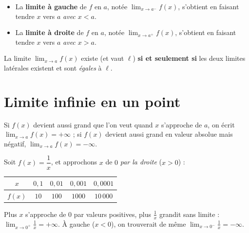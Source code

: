 \begin{definition}
\begin{itemize}
  \item La \textbf{limite à gauche} de $f$ en $a$, notée $\displaystyle\lim_{x\to a^-}f(x)$,
        s'obtient en faisant tendre $x$ vers $a$ \emph{avec $x<a$}.
  \item La \textbf{limite à droite} de $f$ en $a$, notée $\displaystyle\lim_{x\to a^+}f(x)$,
        s'obtient en faisant tendre $x$ vers $a$ \emph{avec $x>a$}.
\end{itemize}
La limite $\displaystyle\lim_{x\to a}f(x)$ existe (et vaut $\ell$) \textbf{si et seulement si}
les deux limites latérales existent et sont \emph{égales} à $\ell$.
\end{definition}

\section{Limite infinie en un point}

\begin{aretenir}
Si $f(x)$ devient aussi grand que l'on veut quand $x$ s'approche de $a$, on écrit
$\displaystyle\lim_{x\to a}f(x)=+\infty$ ; si $f(x)$ devient aussi grand en valeur
absolue mais négatif, $\displaystyle\lim_{x\to a}f(x)=-\infty$.
\end{aretenir}

\begin{exemple}
Soit $f(x)=\dfrac{1}{x}$, et approchons $x$ de $0$ \emph{par la droite} ($x>0$) :
\begin{center}\renewcommand{\arraystretch}{1.25}
\begin{tabular}{@{}c|cccc@{}}
\toprule
$x$    & $0{,}1$ & $0{,}01$ & $0{,}001$ & $0{,}0001$ \\
\midrule
$f(x)$ & $10$    & $100$    & $1000$    & $10\,000$ \\
\bottomrule
\end{tabular}
\end{center}
Plus $x$ s'approche de $0$ par valeurs positives, plus $\frac1x$ grandit sans limite :
$\displaystyle\lim_{x\to 0^+}\frac1x=+\infty$. À gauche ($x<0$), on trouverait de même
$\displaystyle\lim_{x\to 0^-}\frac1x=-\infty$.
\end{exemple}

\begin{illus}
\end{illus}

